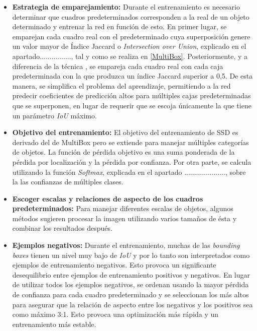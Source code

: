 \documentclass[a4paper, 12pt, spanish, chapterprefix, numbers=noenddot]{book}
\begin{document}
\begin{itemize}
\item \textbf{Estrategia de emparejamiento:}  Durante el entrenamiento es necesario determinar que cuadros predeterminados corresponden a la  real de un objeto determinado y entrenar la red en función de esto. En primer lugar, se emparejan cada cuadro real con el predeterminado cuya superposición genere un valor mayor de Índice Jaccard o \textit{Intersection over Union}, explicado en el apartado................, tal y como se realiza en \ref{MultiBox}. Posteriormente, y a diferencia de la técnica , se empareja cada cuadro real con cada caja predeterminada con la que produzca un índice Jaccard superior a 0,5. De esta manera, se simplifica el problema del aprendizaje, permitiendo a la red predecir coeficientes de predicción altos para múltiples cajas predeterminadas que se superponen, en lugar de requerir que se escoja únicamente la que tiene un parámetro \textit{IoU} máximo.

\item \textbf{Objetivo del entrenamiento:} El objetivo del entrenamiento de SSD es derivado del de MultiBox pero se extiende para manejar múltiples categorías de objetos. La función de pérdida objetivo es una suma ponderada de la pérdida por localización y la pérdida por confianza. Por otra parte, se calcula utilizando la función \textit{Softmax}, explicada en el apartado ....................., sobre la las confianzas de múltiples clases.

\item \textbf{Escoger escalas y relaciones de aspecto de los cuadros predeterminados:} Para manejar diferentes escalas de objetos, algunos métodos sugieren procesar la imagen utilizando varios tamaños de ésta y combinar los resultados después.

\item \textbf{Ejemplos negativos:} Durante el entrenamiento, muchas de las \textit{bounding boxes} tienen un nivel muy bajo de \textit{IoU} y por lo tanto son interpretados como ejemplos de entrenamiento negativos. Esto provoca un significante desequilibrio entre ejemplos de entrenamiento positivos y negativos. En lugar de utilizar todos los ejemplos negativos, se ordenan usando la mayor pérdida de confianza para cada cuadro predeterminado y se seleccionan los más altos para asegurar que la relación de aspecto entre los negativos y los positivos sea como máximo 3:1. Esto provoca una optimización más rápida y un entrenamiento más estable.\\


\end{itemize}
\end{document}
